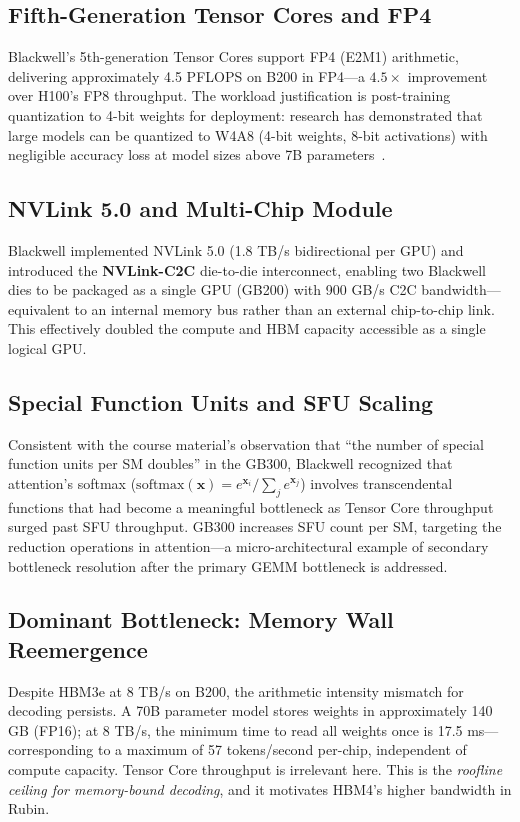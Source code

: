 \documentclass[10pt,twocolumn]{article}
\begin{document}
\subsection{Fifth-Generation Tensor Cores and FP4}

Blackwell's 5th-generation Tensor Cores support FP4 (E2M1) arithmetic, delivering approximately 4.5 PFLOPS on B200 in FP4—a $4.5\times$ improvement over H100's FP8 throughput. The workload justification is post-training quantization to 4-bit weights for deployment: research has demonstrated that large models can be quantized to W4A8 (4-bit weights, 8-bit activations) with negligible accuracy loss at model sizes above 7B parameters~\citep{dettmers2023qlora}.

\subsection{NVLink 5.0 and Multi-Chip Module}

Blackwell implemented NVLink 5.0 (1.8 TB/s bidirectional per GPU) and introduced the \textbf{NVLink-C2C} die-to-die interconnect, enabling two Blackwell dies to be packaged as a single GPU (GB200) with 900 GB/s C2C bandwidth—equivalent to an internal memory bus rather than an external chip-to-chip link. This effectively doubled the compute and HBM capacity accessible as a single logical GPU.

\subsection{Special Function Units and SFU Scaling}

Consistent with the course material's observation that ``the number of special function units per SM doubles'' in the GB300, Blackwell recognized that attention's softmax ($\text{softmax}(\mathbf{x}) = e^{\mathbf{x}_i}/\sum_j e^{\mathbf{x}_j}$) involves transcendental functions that had become a meaningful bottleneck as Tensor Core throughput surged past SFU throughput. GB300 increases SFU count per SM, targeting the reduction operations in attention—a micro-architectural example of secondary bottleneck resolution after the primary GEMM bottleneck is addressed.

\subsection{Dominant Bottleneck: Memory Wall Reemergence}

Despite HBM3e at 8 TB/s on B200, the arithmetic intensity mismatch for decoding persists. A 70B parameter model stores weights in approximately 140 GB (FP16); at 8 TB/s, the minimum time to read all weights once is 17.5 ms—corresponding to a maximum of 57 tokens/second per-chip, independent of compute capacity. Tensor Core throughput is irrelevant here. This is the \textit{roofline ceiling for memory-bound decoding}, and it motivates HBM4's higher bandwidth in Rubin.
\end{document}
